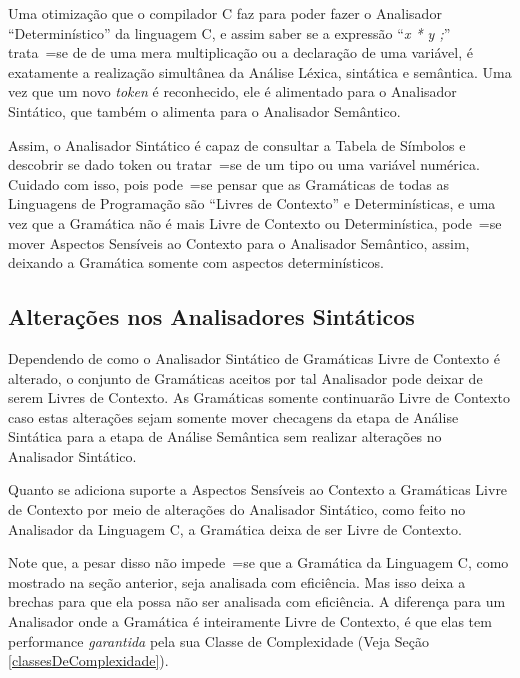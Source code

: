 {    Uma otimização que o compilador C faz para poder fazer o Analisador ``Determinístico'' da linguagem C,
    e assim saber se a expressão ``\textit{x * y ;}'' trata~=se de de uma mera multiplicação ou
    a declaração de uma variável,
    é exatamente a realização simultânea da Análise Léxica,
    sintática e
    semântica.
    Uma vez que um novo \textit{token} é reconhecido,
    ele é alimentado para o Analisador Sintático,
    que também o alimenta para o Analisador Semântico.

    Assim,
    o Analisador Sintático é capaz de consultar a Tabela de Símbolos \cite{ahoCompilerDragonBook} e
    descobrir se dado token ou
    tratar~=se de um tipo ou
    uma variável numérica.
    Cuidado com isso,
    pois pode~=se pensar que as Gramáticas de todas as Linguagens de Programação são ``Livres de Contexto'' e
    Determinísticas,
    e uma vez que a Gramática não é mais Livre de Contexto ou
    Determinística,
    pode~=se mover Aspectos Sensíveis ao Contexto para o Analisador Semântico,
    assim,
    deixando a Gramática somente com aspectos determinísticos.


\subsection{Alterações nos Analisadores Sintáticos}

    Dependendo de como o Analisador Sintático de Gramáticas Livre de Contexto é alterado,
    o conjunto de Gramáticas aceitos por tal Analisador pode deixar de serem Livres de Contexto.
    As Gramáticas somente continuarão Livre de Contexto caso estas alterações sejam somente mover checagens da etapa de Análise Sintática para a etapa de Análise Semântica sem realizar alterações no Analisador Sintático.

    Quanto se adiciona suporte a Aspectos Sensíveis ao Contexto \cite{contextSensitiveParsing} a Gramáticas Livre de Contexto por meio de alterações do Analisador Sintático,
    como feito no Analisador da Linguagem C,
    a Gramática deixa de ser Livre de Contexto.

    Note que,
    a pesar disso não impede~=se que a Gramática da Linguagem C,
    como mostrado na seção anterior,
    seja analisada com eficiência.
    Mas isso deixa a brechas para que ela possa não ser analisada com eficiência.
    A diferença para um Analisador onde a Gramática é inteiramente Livre de Contexto,
    é que elas tem performance \textit{garantida} pela sua Classe de Complexidade (Veja Seção \ref{classesDeComplexidade}).

}
